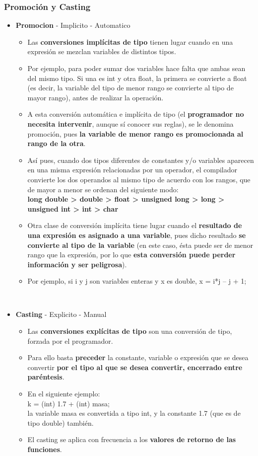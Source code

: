 \documentclass[letterpaper]{report}
\begin{document}
\subsubsection*{Promoción y Casting}
\begin{itemize}
  \item \textbf{Promocion} - Implicito - Automatico
  \begin{itemize}
    \item Las \textbf{conversiones implícitas de tipo} tienen lugar cuando en una expresión se mezclan variables de distintos tipos.
    \item  Por ejemplo, para poder sumar dos variables hace falta que ambas sean del mismo tipo. Si una es int y otra float, la primera se convierte a float (es decir, la variable del tipo de menor rango se convierte al tipo de mayor rango), antes de realizar la operación. 
    \item A esta conversión automática e implícita de tipo (el \textbf{programador no necesita intervenir}, aunque sí conocer sus reglas), se le denomina promoción, pues \textbf{la variable de menor rango es promocionada al rango de la otra}.
    \item Así pues, cuando dos tipos diferentes de constantes y/o variables aparecen en una misma expresión relacionadas por un operador, el compilador convierte los dos operandos al mismo tipo de acuerdo con los rangos, que de mayor a menor se ordenan del siguiente modo:\\
\textbf{long double > double > float > unsigned long > long > unsigned int > int > char}
\item Otra clase de conversión implícita tiene lugar cuando el \textbf{resultado de una expresión es asignado a una variable}, pues dicho resultado \textbf{se convierte al tipo de la variable} (en este caso, ésta puede ser de menor rango que la expresión, por lo que \textbf{esta conversión puede perder información y ser peligrosa}).
\item Por ejemplo, si i y j son variables enteras y x es double, x = i*j – j + 1;
  \end{itemize} \ \\
  \item \textbf{Casting} - Explicito - Manual
  \begin{itemize}
    \item  Las \textbf{conversiones explícitas de tipo} son una conversión de tipo, forzada por el programador. 
    \item Para ello basta \textbf{preceder} la constante, variable o expresión que se desea convertir \textbf{por el tipo al que se desea convertir, encerrado entre paréntesis}. 
    \item En el siguiente ejemplo: \\
    k = (int) 1.7 + (int) masa;\\
    la variable masa es convertida a tipo int, y la constante 1.7 (que es de tipo double) también.
    \item El casting se aplica con frecuencia a los \textbf{valores de retorno de las funciones}.
  \end{itemize}
\end{itemize}
\pagebreak
\end{document}
